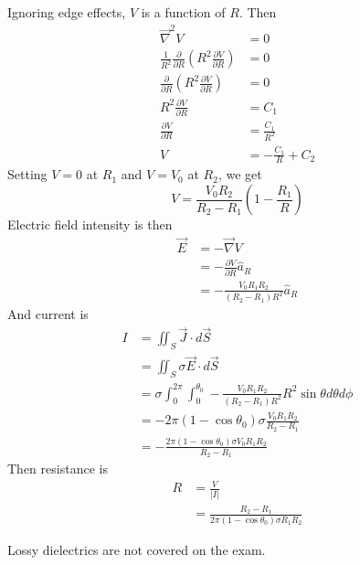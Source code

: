 \documentclass[answers]{exam}
\begin{document}
\begin{questions}
\begin{solution}
	Ignoring edge effects, $V$ is a function of $R$. Then
	\begin{align*}
		\vec \nabla^2 V &= 0 \\
		\frac{1}{R^2} \frac{\partial}{\partial R}\left(R^2\frac{\partial V}{\partial R}\right) &= 0 \\
		\frac{\partial}{\partial R}\left(R^2\frac{\partial V}{\partial R}\right) &= 0 \\
		R^2\frac{\partial V}{\partial R} &= C_1 \\
		\frac{\partial V}{\partial R} &= \frac{C_1}{R^2} \\
		V &= -\frac{C_1}{R} + C_2
	\end{align*}
	Setting $V=0$ at $R_1$ and $V=V_0$ at $R_2$, we get
	$$V = \frac{V_0R_2}{R_2-R_1}\left(1-\frac{R_1}{R}\right)$$
	Electric field intensity is then
	\begin{align*}
		\vec E &= -\vec \nabla V \\
		       &= -\frac{\partial V}{\partial R} \hat a_R \\
		       &= -\frac{V_0R_1R_2}{(R_2-R_1)R^2} \hat a_R
	\end{align*}
	And current is
	\begin{align*}
		I &= \iint_S \vec J \cdot d\vec S \\
		  &= \iint_S \sigma \vec E \cdot d\vec S \\
		  &= \sigma \int_0^{2\pi} \int_0^{\theta_0} -\frac{V_0R_1R_2}{(R_2-R_1)R^2} R^2\sin\theta d\theta d\phi \\
		  &= -2\pi(1-\cos\theta_0)\sigma \frac{V_0R_1R_2}{R_2-R_1} \\
		  &= -\frac{2\pi(1-\cos\theta_0)\sigma V_0R_1R_2}{R_2-R_1}
	\end{align*}
	Then resistance is
	\begin{align*}
		R &= \frac{V}{|I|} \\
		  &= \frac{R_2-R_1}{2\pi(1-\cos\theta_0)\sigma R_1R_2}
	\end{align*}
\end{solution}


\begin{solution}
    Lossy dielectrics are not covered on the exam.
\end{solution}



\end{questions}
\end{document}
